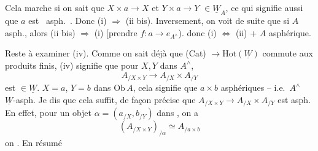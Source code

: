 \documentclass[11pt,a4paper]{article}
\begin{document}

Cela marche si on sait que $X \times a \to X$ et $Y \times a \to Y$
$\in \underline{W}_A$, ce qui signifie aussi que 
$a$ est \ asph.\ \struck{\ill{}}. Donc (i)
$\Longrightarrow$ (ii bis). 
 Inversement, on voit de suite que si $A$ asph., alors
(ii bis) $\Longrightarrow$ (i) [prendre $f : a \to e_{A^{\wedge}}$).
donc (i) $\Longleftrightarrow$ (ii) + $A$ asphérique.


Reste à examiner (iv). Comme on sait déjà que (Cat) $\to
\mathrm{Hot}(\underline{W})$ commute aux produits finis, (iv) signifie
que pour $X, Y$ dans $A^{\wedge}$,
\[
  A_{/X \times Y} \to A_{/X} \times A_{/Y}
\]
est $\in \underline{W}$.  
$X = a$, $Y = b$ dans $\mathrm{Ob}\,A$, cela signifie que $a \times b$
asphériques -- i.e.\ $A^{\wedge}$ \
$\underline{W}$-asph. Je dis que cela suffit, de façon précise que
$A_{/X \times Y} \to A_{/X} \times A_{/Y}$ est asph. En effet, pour un
objet $\alpha = (a_{/X}, b_{/Y})$ dans \uncertain{le second membre}, on a
\[
  (A_{/X \times Y})_{/\alpha} \simeq A_{/a \times b}
\]
 on . En résumé

\end{document}

